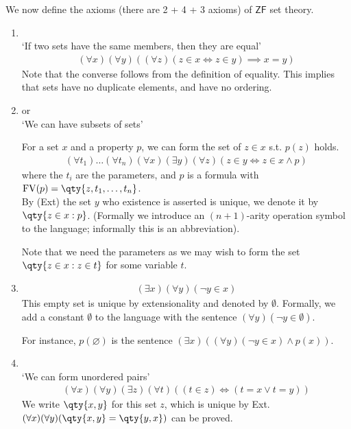 We now define the axioms (there are 2 + 4 + 3 axioms) of $\mathsf{ZF}$ set theory.
\begin{enumerate}
    \item {} \\
    `If two sets have the same members, then they are equal'
    \begin{align*}
        (\forall x)(\forall y)((\forall z)(z \in x \Leftrightarrow z \in y) \implies x = y)
    \end{align*}
    Note that the converse follows from the definition of equality.
    This implies that sets have no duplicate elements, and have no ordering.

    \item {} or  \\
    `We can have subsets of sets'

    For a set $x$ and a property $p$, we can form the set of $z \in x$ s.t. $p(z)$ holds.
    \begin{align*}
        (\forall t_1)\dots(\forall t_n)(\forall x)(\exists y)(\forall z)(z \in y \Leftrightarrow z \in x \wedge p)
    \end{align*}
    where the $t_i$ are the parameters, and $p$ is a formula with $\FV(p) = \qty{z, t_1, \dots, t_n}$. \\
    By (Ext) the set $y$ who existence is asserted is unique, we denote it by $\qty{z \in x : p}$.
    (Formally we introduce an $(n + 1)$-arity operation symbol to the language; informally this is an abbreviation).

    \begin{example}
        Note that we need the parameters as we may wish to form the set $\qty{z \in x : z \in t}$ for some variable $t$.
    \end{example}
    \item {}
    \begin{align*}
        (\exists x)(\forall y)(\neg y \in x)
    \end{align*}
    This empty set is unique by extensionality and denoted by $\emptyset$.
    Formally, we add a constant $\emptyset$ to the language with the sentence $(\forall y)(\neg y \in \emptyset)$.

    \begin{example}
        For instance, $p(\varnothing)$ is the sentence $(\exists x)((\forall y)(\neg y \in x) \wedge p(x))$.
    \end{example}
    \item {} \\
    `We can form unordered pairs'
    \begin{align*}
        (\forall x)(\forall y)(\exists z)(\forall t)((t \in z) \Leftrightarrow (t = x \vee t = y))
    \end{align*}
    We write $\qty{x, y}$ for this set $z$, which is unique by Ext.
    $(\forall x)(\forall y) (\qty{x, y} = \qty{y, x})$ can be proved.


\end{enumerate}
